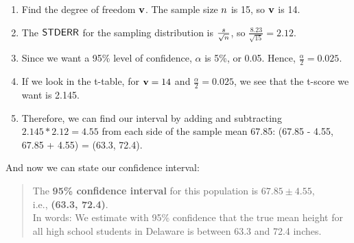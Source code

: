 \documentclass[../../../main.tex]{subfiles}
\begin{document}
\begin{enumerate}

  \item Find the degree of freedom $\DegFreedom/$. The sample size $\samplesize/$ is 15, so $\DegFreedom/$ is 14.

  \item The $\StdErr/$ for the sampling distribution is $\frac{\samplestdev}{\sqrt{\samplesize/}}$, so $\frac{8.23}{\sqrt{15}} = 2.12$.

  \item Since we want a 95\% level of confidence, $\alpha$ is 5\%, or 0.05. Hence, $\frac{\alpha}{2} = 0.025$. 

  \item If we look in the t-table, for $\DegFreedom/ = 14$ and $\frac{\alpha}{2} = 0.025$, we see that the t-score we want is 2.145.

  \item Therefore, we can find our interval by adding and subtracting $2.145 * 2.12 = 4.55$ from each side of the sample mean 67.85: (67.85 - 4.55, 67.85 + 4.55) = (63.3, 72.4). 

\end{enumerate}

\noindent
And now we can state our confidence interval:

\begin{quote}
  The \textbf{95\% confidence interval} for this population is $\mathbf{67.85 \pm 4.55}$, \\
  i.e., \textbf{(63.3, 72.4)}. \\

  In words: We estimate with 95\% confidence that the true mean height for all high school students in Delaware is between 63.3 and 72.4 inches.
\end{quote}
\end{document}
